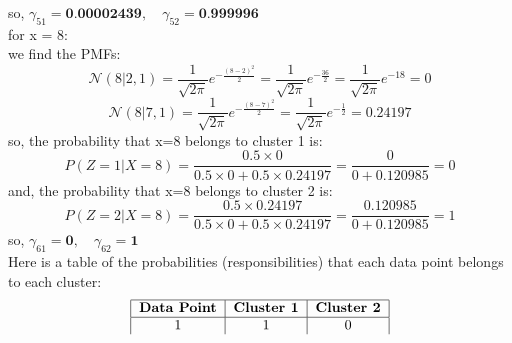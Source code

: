 \documentclass{article}
\begin{document}
\begin{enumerate}
\[\]
so, $\gamma_{51} = \textbf{0.00002439}, \quad \gamma_{52} = \textbf{0.999996}$
\\ for x = 8:
\\ we find the PMFs:
\[
\mathcal{N}(8 | 2, 1) = \frac{1}{\sqrt{2\pi}} e^{-\frac{(8-2)^2}{2}} = \frac{1}{\sqrt{2\pi}} e^{-\frac{36}{2}} = \frac{1}{\sqrt{2\pi}} e^{-18} = 0
\]
\[
\mathcal{N}(8 | 7, 1) = \frac{1}{\sqrt{2\pi}} e^{-\frac{(8-7)^2}{2}} = \frac{1}{\sqrt{2\pi}} e^{-\frac{1}{2}} = 0.24197
\]
so, the probability that x=8 belongs to cluster 1 is:
\[
P(Z = 1 | X = 8) = \frac{0.5 \times 0}{0.5 \times 0 + 0.5 \times 0.24197} = \frac{0}{0 + 0.120985} = 0
\]
and, the probability that x=8 belongs to cluster 2 is:
\[
P(Z = 2 | X = 8) = \frac{0.5 \times 0.24197}{0.5 \times 0 + 0.5 \times 0.24197} = \frac{0.120985}{0 + 0.120985} = 1
\]
so, $\gamma_{61} = \textbf{0}, \quad \gamma_{62} = \textbf{1}$
\\ Here is a table of the probabilities (responsibilities) that each data point belongs to each cluster:
\[
\begin{tabular}{|c|c|c|c|c|c|c|c|}
\hline
\textbf{Data Point} & \textbf{Cluster 1} & \textbf{Cluster 2} \\
\hline
1 & 1 & 0 \\


\end{tabular}\]
\end{enumerate}
\end{document}
